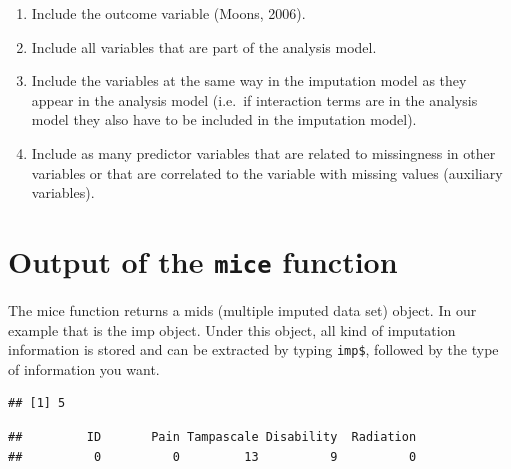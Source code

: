 \documentclass[]{book}
\newenvironment{Shaded}{\begin{snugshade}}{\end{snugshade}}
\newcommand{\OperatorTok}[1]{\textcolor[rgb]{0.81,0.36,0.00}{\textbf{#1}}}
\newcommand{\NormalTok}[1]{#1}
\theoremstyle{definition}
\theoremstyle{definition}
\theoremstyle{definition}
\theoremstyle{remark}
\begin{document}
\begin{enumerate}
\def\labelenumi{\arabic{enumi}.}
\item
  Include the outcome variable (Moons, 2006).
\item
  Include all variables that are part of the analysis model.
\item
  Include the variables at the same way in the imputation model as they
  appear in the analysis model (i.e.~if interaction terms are in the
  analysis model they also have to be included in the imputation model).
\item
  Include as many predictor variables that are related to missingness in
  other variables or that are correlated to the variable with missing
  values (auxiliary variables).
\end{enumerate}

\section{\texorpdfstring{Output of the \texttt{mice}
function}{Output of the mice function}}\label{output-of-the-mice-function}

The mice function returns a mids (multiple imputed data set) object. In
our example that is the imp object. Under this object, all kind of
imputation information is stored and can be extracted by typing
\texttt{imp\$}, followed by the type of information you want.

\begin{Shaded}
\end{Shaded}

\begin{verbatim}
## [1] 5
\end{verbatim}

\begin{Shaded}
\end{Shaded}

\begin{verbatim}
##         ID       Pain Tampascale Disability  Radiation 
##          0          0         13          9          0
\end{verbatim}

\begin{Shaded}
\end{Shaded}
\end{document}
